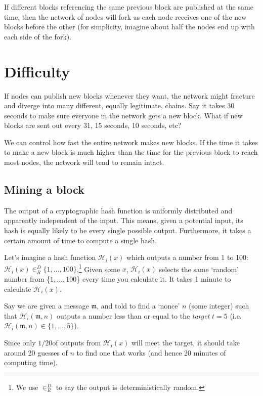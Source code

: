 If different blocks referencing the same previous block are published at the same time, then the network of nodes will fork as each node receives one of the new blocks before the other (for simplicity, imagine about half the nodes end up with each side of the fork).



\section{Difficulty}
\label{sec:difficulty}

If nodes can publish new blocks whenever they want, the network might fracture and diverge into many different, equally legitimate, chains. Say it takes 30 seconds to make sure everyone in the network gets a new block. What if new blocks are sent out every 31, 15 seconds, 10 seconds, etc?

We can control how fast the entire network makes new blocks. If the time it takes to make a new block is much higher than the time for the previous block to reach most nodes, the network will tend to remain intact.


\subsection{Mining a block}

The output of a cryptographic hash function is uniformly distributed and apparently independent of the input. This means, given a potential input, its hash is equally likely to be every single possible output. Furthermore, it takes a certain amount of time to compute a single hash.

Let's imagine a hash function $\mathcal{H}_i(x)$ which outputs a number from 1 to 100: $\mathcal{H}_i(x) \in^D_R \{1,...,100\}$.\footnote{We use $\in^D_R$ to say the output is deterministically random.} Given some $x$, $\mathcal{H}_i(x)$ selects the same `random' number from \{$1,...,100$\} every time you calculate it. It takes 1 minute to calculate $\mathcal{H}_i(x)$.

Say we are given a message $\mathfrak{m}$, and told to find a `nonce' $n$ (some integer) such that $\mathcal{H}_i(\mathfrak{m},n)$ outputs a number less than or equal to the {\em target} $t = 5$ (i.e. $\mathcal{H}_i(\mathfrak{m},n) \in \{1,...,5\}$). 

Since only $1/20$\nth of outputs from $\mathcal{H}_i(x)$ will meet the target, it should take around 20 guesses of $n$ to find one that works (and hence 20 minutes of computing time).

